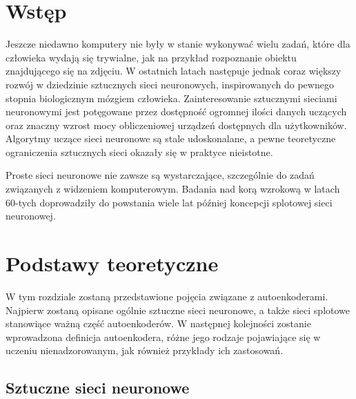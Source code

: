 \documentclass[12pt]{mwbk}
\theoremstyle{plain}
\theoremstyle{definition}
\theoremstyle{remark}
\begin{document}



\tableofcontents


\chapter*{Wstęp}

Jeszcze niedawno komputery nie były w stanie wykonywać wielu zadań, które dla człowieka wydają się trywialne, jak na przykład rozpoznanie obiektu znajdującego się na zdjęciu. W ostatnich latach następuje jednak coraz większy rozwój w dziedzinie sztucznych sieci neuronowych, inspirowanych do pewnego stopnia biologicznym mózgiem człowieka. Zainteresowanie sztucznymi sieciami neuronowymi jest potęgowane przez dostępność ogromnej ilości danych uczących oraz znaczny wzrost mocy obliczeniowej urządzeń dostępnych dla użytkowników. Algorytmy uczące sieci neuronowe są stale udoskonalane, a pewne teoretyczne ograniczenia sztucznych sieci okazały się w praktyce nieistotne.

Proste sieci neuronowe nie zawsze są wystarczające, szczególnie do zadań związanych z widzeniem komputerowym. Badania nad korą wzrokową w latach 60-tych doprowadziły do powstania wiele lat później koncepcji splotowej sieci neuronowej.

\chapter{Podstawy teoretyczne}

W tym rozdziale zostaną przedstawione pojęcia związane z autoenkoderami. Najpierw zostaną opisane ogólnie sztuczne sieci neuronowe, a także sieci splotowe stanowiące ważną część autoenkoderów. W następnej kolejności zostanie wprowadzona definicja autoenkodera, różne jego rodzaje pojawiające się w uczeniu nienadzorowanym, jak również przykłady ich zastosowań.

\section{Sztuczne sieci neuronowe}
\end{document}
